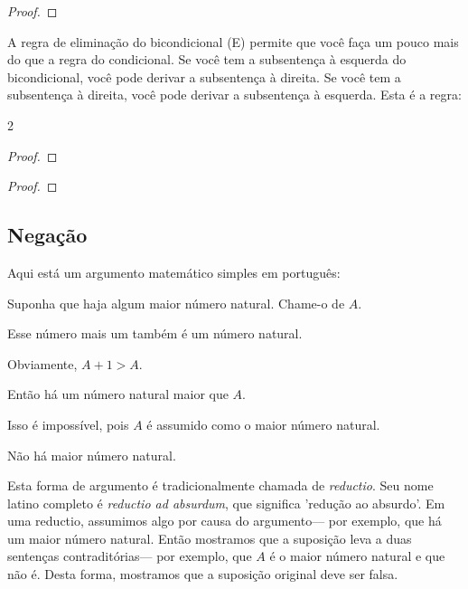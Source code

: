 \begin{proof}
	\open
		 
	\close
	\open
		 
	\close
\end{proof}

A regra de eliminação do bicondicional ({\eiff}E) permite que você faça um pouco mais do que a regra do condicional. Se você tem a subsentença à esquerda do bicondicional, você pode derivar a subsentença à direita. Se você tem a subsentença à direita, você pode derivar a subsentença à esquerda. Esta é a regra:

\begin{multicols}{2}
\begin{proof}
	 
\end{proof}

\begin{proof}
	 
\end{proof}
\end{multicols}




\subsection{Negação}
Aqui está um argumento matemático simples em português:
\begin{earg}
\item[] Suponha que haja algum maior número natural. Chame-o de $A$.
\item[] Esse número mais um também é um número natural.
\item[] Obviamente, $A+1 > A$.
\item[] Então há um número natural maior que $A$.
\item[] Isso é impossível, pois $A$ é assumido como o maior número natural.
\item[\therefore] Não há maior número natural.
\end{earg}
Esta forma de argumento é tradicionalmente chamada de \emph{reductio}. Seu nome latino completo é \emph{reductio ad absurdum}, que significa 'redução ao absurdo'. Em uma reductio, assumimos algo por causa do argumento--- por exemplo, que há um maior número natural. Então mostramos que a suposição leva a duas sentenças contraditórias--- por exemplo, que $A$ é o maior número natural e que não é. Desta forma, mostramos que a suposição original deve ser falsa.

